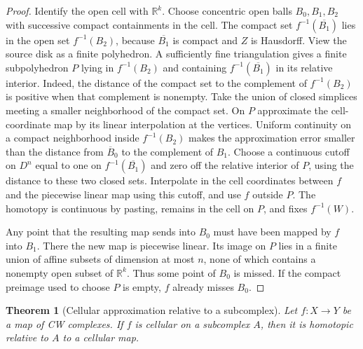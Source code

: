 \documentclass[11pt,oneside,openany]{book}
\theoremstyle{plain}
\newtheorem{theorem}{Theorem}[chapter]
\theoremstyle{definition}
\theoremstyle{remark}
\begin{document}
\begin{proof}
Identify the open cell with \(\mathbb R^k\).
Choose concentric open balls \(B_0,B_1,B_2\) with
successive compact containments in the cell. The compact
set \(f^{-1}(\overline{B_1})\) lies in the open set
\(f^{-1}(B_2)\), because \(\overline{B_1}\) is compact
and \(Z\) is Hausdorff. View the source disk as a finite
polyhedron. A sufficiently fine triangulation gives a
finite subpolyhedron \(P\) lying in \(f^{-1}(B_2)\)
and containing \(f^{-1}(\overline{B_1})\) in its relative
interior. Indeed, the distance of the compact set to
the complement of \(f^{-1}(B_2)\) is positive when that
complement is nonempty. Take the union of closed simplices
meeting a smaller neighborhood of the compact set.
On \(P\) approximate the cell-coordinate map by its linear
interpolation at the vertices. Uniform continuity on a
compact neighborhood inside \(f^{-1}(B_2)\) makes the
approximation error smaller than the distance from
\(\overline B_0\) to the complement of \(B_1\).
Choose a continuous cutoff on \(D^n\) equal to one on
\(f^{-1}(\overline{B_1})\) and zero off the relative
interior of \(P\), using the distance to these two
closed sets. Interpolate in the cell coordinates
between \(f\) and the piecewise linear map using this
cutoff, and use \(f\) outside \(P\). The homotopy is
continuous by pasting, remains in the cell on \(P\),
and fixes \(f^{-1}(W)\).

Any point that the resulting map sends into \(B_0\)
must have been mapped by \(f\) into \(B_1\). There the
new map is piecewise linear. Its image on \(P\) lies
in a finite union of affine subsets of dimension at
most \(n\), none of which contains a nonempty open subset
of \(\mathbb R^k\). Thus some point of \(B_0\) is missed.
If the compact preimage used to choose \(P\) is empty,
\(f\) already misses \(B_0\).
\end{proof}

\begin{theorem}[Cellular approximation relative to a subcomplex]
\label{thm:p202-cellular-approx}
Let \(f:X\to Y\) be a map of CW complexes. If \(f\) is
cellular on a subcomplex \(A\), then it is homotopic
relative to \(A\) to a cellular map.
\end{theorem}
\end{document}
